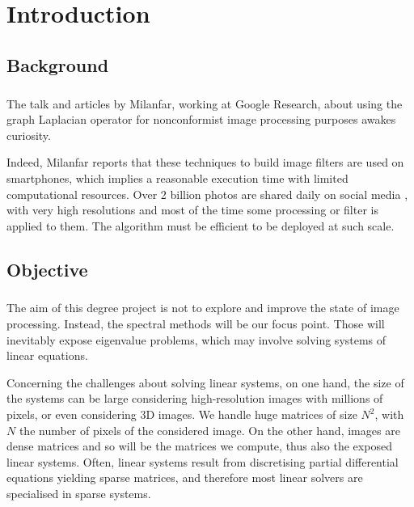 \chapter{Introduction}

\section{Background}

\paragraph{}
The talk \cite{siam_slides_2016} and articles \cite{glide_2014} \cite{talebi_nonlocal_2014} by Milanfar, working at Google Research, about using the graph Laplacian operator for nonconformist image processing purposes awakes curiosity.

Indeed, Milanfar reports that these techniques to build image filters are used on smartphones, which implies a reasonable execution time with limited computational resources.
Over 2 billion photos are shared daily on social media \cite{siam_slides_2016}, with very high resolutions and most of the time some processing or filter is applied to them.
The algorithm must be efficient to be deployed at such scale.

\section{Objective}

\paragraph{}
The aim of this degree project is not to explore and improve the state of image processing.
Instead, the spectral methods will be our focus point.
Those will inevitably expose eigenvalue problems, which may involve solving systems of linear equations.

Concerning the challenges about solving linear systems, on one hand, the size of the systems can be large considering high-resolution images with millions of pixels, or even considering 3D images.
We handle huge matrices of size \(N^2\), with \(N\) the number of pixels of the considered image.
On the other hand, images are dense matrices and so will be the matrices we compute, thus also the exposed linear systems.
Often, linear systems result from discretising partial differential equations yielding sparse matrices, and therefore most linear solvers are specialised in sparse systems.

